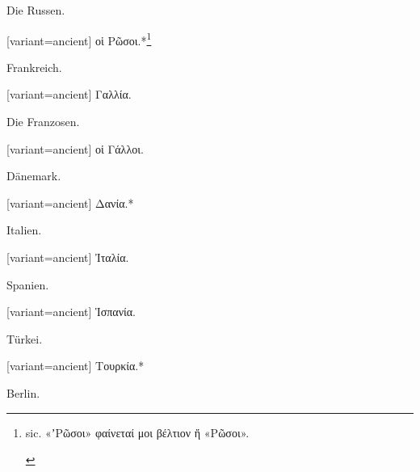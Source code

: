 Die Russen.

\switchcolumn

\begin{greek}[variant=ancient]%
οἱ Ρῶσοι.{*}\footnote{\begin{latin}%
sic.\textgreek[variant=ancient]{ «ʼΡῶσοι» φαίνεταί μοι βέλτιον ἤ «Ρῶσοι».}\end{latin}%
}

\end{greek}%
\switchcolumn*

Frankreich.

\switchcolumn

\begin{greek}[variant=ancient]%
Γαλλία.

\end{greek}%
\switchcolumn*

Die Franzosen.

\switchcolumn

\begin{greek}[variant=ancient]%
οἱ Γάλλοι.

\end{greek}%
\switchcolumn*

Dänemark.

\switchcolumn

\begin{greek}[variant=ancient]%
Δανία.{*}

\end{greek}%
\switchcolumn*

Italien.

\switchcolumn

\begin{greek}[variant=ancient]%
Ἰταλία.

\end{greek}%
\switchcolumn*

Spanien.

\switchcolumn

\begin{greek}[variant=ancient]%
Ἱσπανία.

\end{greek}%
\switchcolumn*

Türkei.

\switchcolumn

\begin{greek}[variant=ancient]%
Τουρκία.{*}

\end{greek}%
\switchcolumn*

Berlin.


